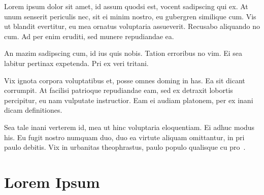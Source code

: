 Lorem ipsum dolor sit amet, id assum quodsi est, vocent sadipscing qui ex. At unum senserit periculis nec, sit ei minim nostro, eu gubergren similique cum. Vis ut blandit evertitur, eu mea ornatus voluptaria assueverit. Recusabo aliquando no cum. Ad per enim eruditi, sed munere repudiandae ea.

An mazim sadipscing cum, id ius quis nobis. Tation erroribus no vim. Ei sea labitur pertinax expetenda. Pri ex veri tritani.

Vix ignota corpora voluptatibus et, posse omnes doming in has. Ea sit dicant corrumpit. At facilisi patrioque repudiandae eam, sed ex detraxit lobortis percipitur, eu nam vulputate instructior. Eam ei audiam platonem, per ex inani dicam definitiones.

Sea tale inani verterem id, mea ut hinc voluptaria eloquentiam. Ei adhuc modus his. Eu fugit nostro numquam duo, duo ea virtute aliquam omittantur, in pri paulo debitis. Vix in urbanitas theophrastus, paulo populo qualisque cu pro~\cite{Ahangi2012,Akram2014,Akram2015}.

\section{Lorem Ipsum}
  